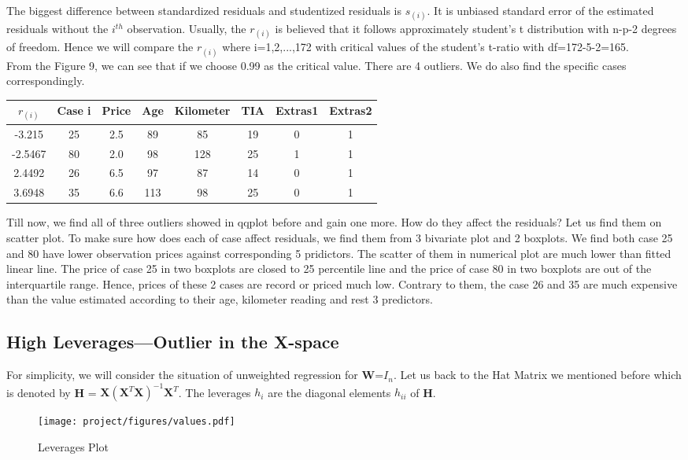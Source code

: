\documentclass[a4paper]{article}
\begin{document}
\noindent
The biggest difference between standardized residuals and studentized residuals is $s_{(i)}$. It is unbiased standard error of the estimated residuals without the $i^{th}$ observation. Usually, the $r_{(i)}$ is believed that it follows approximately student's t distribution with n-p-2 degrees of freedom. Hence we will compare the $r_{(i)}$ where i=1,2,...,172 with critical values of the student's t-ratio with df=172-5-2=165.\\

\noindent
From the Figure 9, we can see that if we choose 0.99 as the critical value. There are 4 outliers. We do also find the specific cases correspondingly.
\begin{table}[!htb]
\centering
\begin{tabular}{cccccccc}
\toprule
$r_{(i)}$ & Case i & Price & Age & Kilometer & TIA & Extras1 & Extras2 \\
\midrule
-3.215     & 25     & 2.5   & 89  & 85        & 19  & 0       & 1       \\
-2.5467    & 80     & 2.0   & 98  & 128       & 25  & 1       & 1       \\
2.4492     & 26     & 6.5   & 97  & 87        & 14  & 0       & 1       \\
3.6948     & 35     & 6.6   & 113 & 98        & 25  & 0       & 1       \\
\bottomrule
\end{tabular}
\end{table}

\noindent 
Till now, we find all of three outliers showed in qqplot before and gain one more. How do they affect the residuals? Let us find them on scatter plot. To make sure how does each of case affect residuals, we find them from 3 bivariate plot and 2 boxplots. We find both case 25 and 80 have lower observation prices against corresponding 5 pridictors. The scatter of them in numerical plot are much lower than fitted linear line. The price of case 25 in two boxplots are closed to 25 percentile line and the price of case 80 in two boxplots are out of the interquartile range. Hence, prices of these 2 cases are record or priced much low. Contrary to them, the case 26 and 35 are much expensive than the value estimated according to their age, kilometer reading and rest 3 predictors. 




\subsection{High Leverages---Outlier in the X-space}
For simplicity, we will consider the situation of unweighted regression for \textbf{W}=\textbf{$I_n$}. Let us back to the Hat Matrix we mentioned before which is denoted by \textbf{H} = $\textbf{X} (\textbf{X}^T \textbf{X})^{-1} \textbf{X}^T$. The leverages $h_i$ are the diagonal elements $h_{ii}$ of \textbf{H}.\\
\begin{figure}[!htb]
    \centering
    \texttt{[image: project/figures/values.pdf]}
    \caption{Leverages Plot}
    \label{11}
\end{figure}
\end{document}
